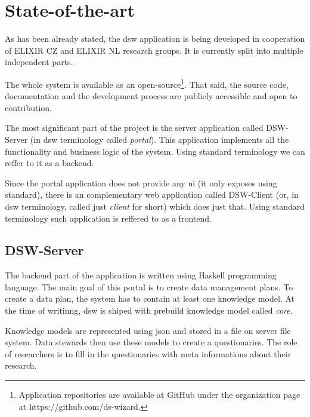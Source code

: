 \section{State-of-the-art}

As has been already stated, the \gls{dsw} application is being developed in cooperation of ELIXIR CZ and ELIXIR NL research groups.
It is currently split into multiple independent parts.

The whole system is available as an open-source\footnote{Application repositories are available at GitHub under the organization page at https://github.com/ds-wizard.}.
That said, the source code, documentation and the development process are publicly accessible and open to contribution.

The most significant part of the project is the server application called DSW-Server (in \gls{dsw} terminology called \textit{portal}).
This application implements all the functionality and business logic of the system.
Using standard terminology we can reffer to it as a backend.

Since the portal application does not provide any \gls{ui} (it only exposes  using  standard), there is an complementary web application called DSW-Client (or, in \gls{dsw} terminology, called just \textit{client} for short) which does just that.
Using standard terminology such application is reffered to as a frontend.


\subsection{DSW-Server}

The backend part of the application is written using Haskell programming language.
The main goal of this portal is to create data management plans. 
To create a data plan, the system has to contain at least one knowledge model.
At the time of writinng, \gls{dsw} is shiped with prebuild knowledge model called \textit{core}.

Knowledge models are represented using \gls{json} and stored in a file on server file system.
Data stewards then use these models to create a questionaries.
The role of researchers is to fill in the questionaries with meta informations about their research.

